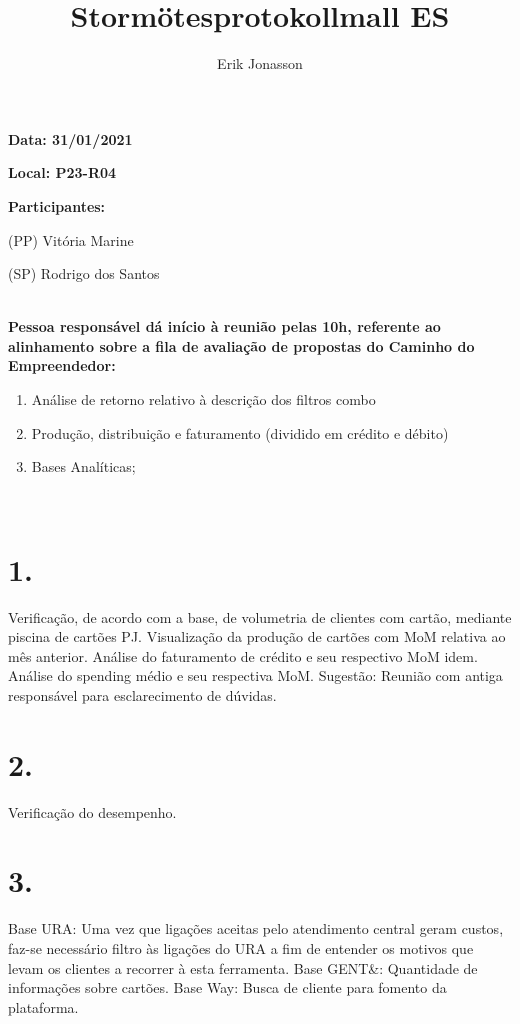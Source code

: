 \documentclass[a4paper, 11pt]{article}
\title{Stormötesprotokollmall ES}
\author{Erik Jonasson}
\begin{document}
\pagestyle{style1}

\textbf{Data: 31/01/2021} %

\textbf{Local: P23-R04} %

\textbf{Participantes:} 
\begin{description}
\item (PP) Vitória Marine
\item (SP) Rodrigo dos Santos

\end{description}

\makebox[\linewidth]{\rule{\linewidth}{0.4pt}}\\
\textbf{Pessoa responsável dá início à reunião pelas 10h, referente ao alinhamento sobre a fila de avaliação de propostas do Caminho do Empreendedor:} 
\begin{enumerate}
\item Análise de retorno relativo à descrição dos filtros combo


\item Produção, distribuição e faturamento (dividido em crédito e débito)
\item Bases Analíticas;




\end{enumerate}
\makebox[\linewidth]{\rule{\linewidth}{0.4pt}}\\

\section*{1.}
Verificação, de acordo com a base, de volumetria de clientes com cartão, mediante piscina de cartões PJ. Visualização da produção de cartões com MoM relativa ao mês anterior. Análise  do faturamento de crédito e seu respectivo MoM idem. Análise do spending médio e seu respectiva MoM.
Sugestão: Reunião com antiga responsável para esclarecimento de dúvidas.


\section*{2. }
Verificação do desempenho.

\section*{3.}
Base URA: Uma vez que ligações aceitas pelo atendimento central geram custos, faz-se necessário filtro às ligações do URA a fim de entender os motivos que levam os clientes a recorrer à esta ferramenta. 
Base GENT&: Quantidade de informações sobre cartões.
Base Way: Busca de cliente para fomento da plataforma.
 
\end{document}
